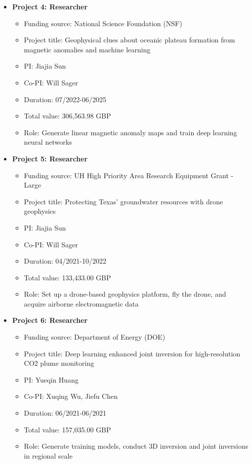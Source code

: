 \documentclass[11pt, a4paper]{article}
\begin{document}
\begin{itemize}
	\item{\textbf{Project 4: Researcher}}
	\begin{itemize}
	\item Funding source: National Science Foundation (NSF)
	\item Project title: Geophysical clues about oceanic plateau formation from magnetic anomalies and machine learning
	\item PI: Jiajia Sun
	\item Co-PI: Will Sager
	\item Duration: 07/2022-06/2025
	\item Total value: 306,563.98 GBP
	\item Role: Generate linear magnetic anomaly maps and train deep learning neural networks
	\end{itemize}
	
	\item{\textbf{Project 5: Researcher}}
	\begin{itemize}
	\item Funding source: UH High Priority Area Research Equipment Grant - Large
	\item Project title: Protecting Texas’ groundwater resources with drone geophysics
	\item PI: Jiajia Sun
	\item Co-PI: Will Sager
	\item Duration: 04/2021-10/2022
	\item Total value: 133,433.00 GBP
	\item Role: Set up a drone-based geophysics platform, fly the drone, and acquire airborne electromagnetic data
	\end{itemize}

	\item{\textbf{Project 6: Researcher}}
	\begin{itemize}
	\item Funding source: Department of Energy (DOE)
	\item Project title: Deep learning enhanced joint inversion for high-resolution CO2 plume monitoring
	\item PI: Yueqin Huang
	\item Co-PI: Xuqing Wu, Jiefu Chen
	\item Duration: 06/2021-06/2021
	\item Total value: 157,035.00 GBP
	\item Role: Generate training models, conduct 3D inversion and joint inversions in regional scale
	\end{itemize}
		

\end{itemize}
\end{document}
